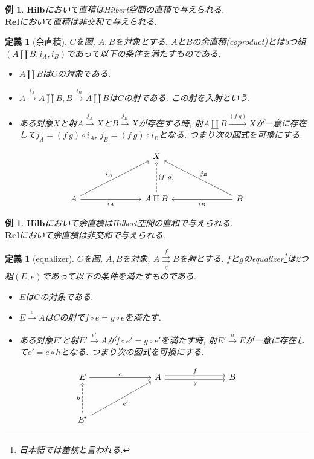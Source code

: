 \documentclass[a4paper,12pt]{ltjsarticle}
\theoremstyle{break}
\newtheorem{defn}[thm]{定義}
\newtheorem{eg}[thm]{例}
\newcommand{\rel}{\mathbf{Rel}}
\newcommand{\hilb}{\mathbf{Hilb}}
\newcommand{\xr}[1]{\xrightarrow{#1}}
\newcommand{\ci}{\circ}
\newcommand{\am}{\amalg}
\numberwithin{equation}{section}
\begin{document}
\begin{eg}
  $\hilb$において直積はHilbert空間の直積で与えられる. \\
  $\rel$において直積は非交和で与えられる. 
\end{eg}

\begin{defn}[余直積]
  $C$を圏, $A, B$を対象とする. 
  $A$と$B$の余直積(coproduct)とは3つ組$(A \am B, i_A, i_B)$であって以下の条件を満たすものである.
  \begin{itemize} 
    \item $A \am B$は$C$の対象である. 
    \item $A \xr{i_A} A \am B, B \xr{i_B} A \am B$は$C$の射である. この射を入射という. 
    \item ある対象$X$と射$A \xr{j_A} X$と$B \xr{j_B} X$が存在する時, 射$A \am B \xr{(f~g)} X$が一意に存在して$j_A = (f~g) \ci i_A$, $j_B = (f~g) \ci i_B$となる. 
    つまり次の図式を可換にする. 
  \end{itemize}   
  \[\begin{tikzcd}
    &&& X \\
    \\
    A &&& {A \am B} &&& B
    \arrow["{(f~g)}"', dashed,  from=3-4, to=1-4]
    \arrow["{i_A}", from=3-1, to=1-4]
    \arrow["{i_A}"', from=3-1, to=3-4]
    \arrow["{j_B}"', from=3-7, to=1-4]
    \arrow["{i_B}", from=3-7, to=3-4]
  \end{tikzcd}\]
\end{defn}

\begin{eg}
  $\hilb$において余直積はHilbert空間の直和で与えられる. \\
  $\rel$において余直積は非交和で与えられる. 
\end{eg}

\begin{defn}[equalizer]
  $C$を圏, $A, B$を対象, $A \overset{f}{\underset{g}{\rightrightarrows}} B$を射とする. 
  $f$と$g$のequalizer\footnote{日本語では差核と言われる.}は2つ組$(E, e)$であって以下の条件を満たすものである. 
  \begin{itemize}
    \item $E$は$C$の対象である. 
    \item $E \xr{e} A$は$C$の射で$f \ci e = g \ci e$を満たす. 
    \item ある対象$E'$と射$E' \xr{e'} A$が$f \ci e' = g \ci e'$を満たす時, 射$E' \xr{h} E$が一意に存在して$e' = e \ci h$となる. 
    つまり次の図式を可換にする. 
  \end{itemize}
  \[\begin{tikzcd}
	  E &&& A &&& B \\
	  \\
	  {E'}
	  \arrow["g"', shift right=1, from=1-4, to=1-7]
	  \arrow["{e'}"', from=3-1, to=1-4]
	  \arrow["e", from=1-1, to=1-4]
	  \arrow["h", from=3-1, dashed, to=1-1]
	  \arrow["f", shift left=1, from=1-4, to=1-7]
  \end{tikzcd}\]
\end{defn}
\end{document}
